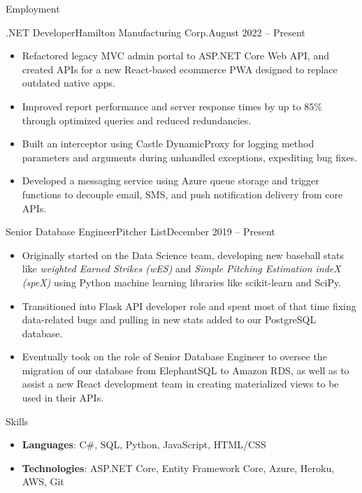 \documentclass[calibri]{mcdowellcv}
\begin{document}
	\makeheader
	
	\begin{cvsection}{Employment}
		\begin{cvsubsection}{.NET Developer}{Hamilton Manufacturing Corp.}{August 2022 -- Present}
			\begin{itemize}
				\item Refactored legacy MVC admin portal to ASP.NET Core Web API, and created APIs for a new React-based ecommerce PWA designed to replace outdated native apps. 
				\item Improved report performance and server response times by up to 85\% through optimized queries and reduced redundancies.
				\item Built an interceptor using Castle DynamicProxy for logging method parameters and arguments during unhandled exceptions, expediting bug fixes. 
				\item Developed a messaging service using Azure queue storage and trigger functions to decouple email, SMS, and push notification delivery from core APIs.
			\end{itemize}
		\end{cvsubsection}
		\begin{cvsubsection}{Senior Database Engineer}{Pitcher List}{December 2019 -- Present}
			\begin{itemize}
				\item Originally started on the Data Science team, developing new baseball stats like \textit{weighted Earned Strikes (wES)} and \textit{Simple Pitching Estimation indeX (speX)} using Python machine learning libraries like scikit-learn and SciPy.
				\item Transitioned into Flask API developer role and spent most of that time fixing data-related bugs and pulling in new stats added to our PostgreSQL database.
				\item Eventually took on the role of Senior Database Engineer to oversee the migration of our database from ElephantSQL to Amazon RDS, as well as to assist a new React development team in creating materialized views to be used in their APIs.
			\end{itemize}
		\end{cvsubsection}
	\end{cvsection}

	\begin{cvsection}{Skills}
		\begin{cvsubsection}{}{}{}	
			\begin{itemize}
				\item \textbf{Languages}: C\#, SQL, Python, JavaScript, HTML/CSS
				\item \textbf{Technologies}: ASP.NET Core, Entity Framework Core, Azure, Heroku, AWS, Git
			\end{itemize}
		\end{cvsubsection}
	\end{cvsection}
\end{document}
